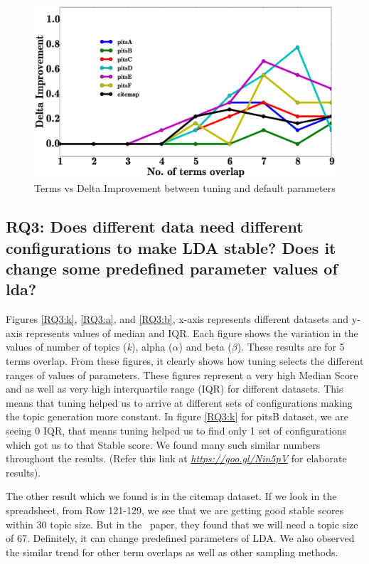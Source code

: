 \documentclass[conference]{IEEEtran}
\theoremstyle{break}
\begin{document}
\begin{center}
\begin{figure}[!htbp]
  \includegraphics[width=\linewidth]{./fig/tuned_delta_vem.eps}
  \caption{Terms vs Delta Improvement between tuning and default parameters}
  \label{fig:delta}
\end{figure}
\vspace{-0.5cm}
\end{center}

\subsection{\textbf{RQ3: Does different data need different configurations to make LDA stable? Does it change some predefined parameter values of lda?}}

Figures \ref{RQ3:k}, \ref{RQ3:a}, and \ref{RQ3:b}, x-axis represents different datasets and y-axis represents values of median and IQR. Each figure shows the variation in the values of number of topics (\textit{k}), alpha ($\alpha$) and beta ($\beta$). These results are for 5 terms overlap. From these figures, it clearly shows how tuning selects the different ranges of values of parameters. These figures represent a very high Median Score and as well as very high interquartile range (IQR) for different datasets. This means that tuning helped us to arrive at different sets of configurations making the topic generation more constant. In figure \ref{RQ3:k} for pitsB dataset, we are seeing 0 IQR, that means tuning helped us to find only 1 set of configurations which got us to that Stable score. We found many such similar numbers throughout the results. (Refer this link at \href{https://goo.gl/Nin5pV}{\textit{https://goo.gl/Nin5pV}} for elaborate results).

The other result which we found is in the citemap dataset. If we look in the spreadsheet, from Row 121-129, we see that we are getting good stable scores within 30 topic size. But in the~\cite{garousi2016citations} paper, they found that we will need a topic size of 67. Definitely, it can change predefined parameters of LDA.
We also observed the similar trend for other term overlaps as well as other sampling methods.
\end{document}
